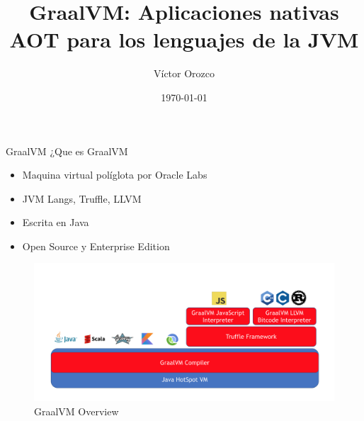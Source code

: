 \documentclass[aspectratio=169]{beamer}
\title{GraalVM: Aplicaciones nativas AOT para los lenguajes de la JVM}
\author{Víctor Orozco}
\institute{Nabenik}
\date{\today}
\begin{document}
{
    \frame{\titlepage}
}


\begin{frame}{GraalVM}
¿Que es GraalVM
	\begin{itemize}
		\item Maquina virtual políglota por Oracle Labs
		\item JVM Langs, Truffle, LLVM
        \item Escrita en Java
        \item Open Source y Enterprise Edition
	\end{itemize}
\end{frame}


\begin{frame}{}
\begin{figure}
	\centering
	\includegraphics[width=\linewidth]{Images/graalvm}
	\caption{GraalVM Overview}
	\label{fig:graalvm}
\end{figure}

\end{frame}
\end{document}
